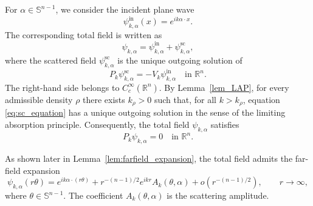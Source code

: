 \documentclass[12pt,a4paper]{amsart}
\numberwithin{equation}{section}
\theoremstyle{plain}
\theoremstyle{definition}
\begin{document}
For $\alpha\in\mathbb{S}^{n-1}$, we consider the incident plane wave
\begin{equation*}
    \psi^{\mathrm{in}}_{k,\alpha}(x)=e^{ik\alpha\cdot x}.
\end{equation*}
The corresponding total field is written as
\begin{equation}\label{eq:total_field}
    \psi_{k,\alpha}
    =
    \psi^{\mathrm{in}}_{k,\alpha}
    +
    \psi^{\mathrm{sc}}_{k,\alpha},
\end{equation}
where the scattered field $\psi^{\mathrm{sc}}_{k,\alpha}$ is the unique outgoing
solution of
\begin{equation}\label{eq:sc_equation}
    P_k\psi^{\mathrm{sc}}_{k,\alpha}
    =
    -V_k\psi^{\mathrm{in}}_{k,\alpha}
    \quad \text{in }\mathbb{R}^n.
\end{equation}
The right-hand side belongs to $C_c^\infty(\mathbb{R}^n)$. By Lemma~\ref{lem_LAP}, for every admissible density $\rho$ there exists
$k_\rho>0$ such that, for all $k>k_\rho$, equation
\eqref{eq:sc_equation} has a unique outgoing solution in the sense of the
limiting absorption principle. Consequently, the total field
$\psi_{k,\alpha}$ satisfies
\begin{equation*}
    P_k\psi_{k,\alpha}=0
    \quad \text{in }\mathbb{R}^n.
\end{equation*}



As shown later in Lemma~\ref{lem:farfield_expansion}, the total field admits
the far-field expansion
\begin{equation}\label{eq:farfield}
    \psi_{k,\alpha}(r\theta)
    =
    e^{ik\alpha\cdot(r\theta)}
    +
    r^{-(n-1)/2}e^{ikr}A_k(\theta,\alpha)
    +
    o(r^{-(n-1)/2}),
    \qquad r\to\infty,
\end{equation}
where $\theta\in\mathbb{S}^{n-1}$. The coefficient $A_k(\theta,\alpha)$ is the scattering amplitude.
\end{document}
